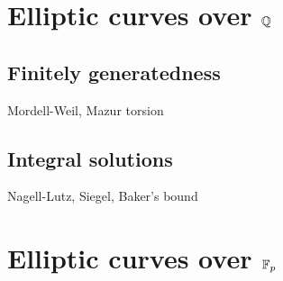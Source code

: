 \documentclass{../../large}
\begin{document}
\chapter{Elliptic curves over $\mathbb{Q}$}
\section{Finitely generatedness}
Mordell-Weil, Mazur torsion
\section{Integral solutions}
Nagell-Lutz, Siegel, Baker's bound
\chapter{Elliptic curves over $\mathbb{F}_p$}
\end{document}
